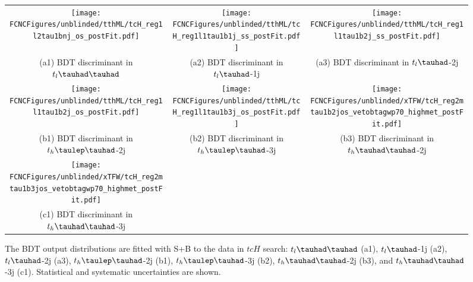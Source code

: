 \begin{figure}[H]
\begin{tabular}{@{}ccc@{}}
\texttt{[image: \\FCNCFigures/unblinded/tthML/tcH\_reg1l2tau1bnj\_os\_postFit.pdf]}&
\texttt{[image: \\FCNCFigures/unblinded/tthML/tcH\_reg1l1tau1b1j\_ss\_postFit.pdf]}&
\texttt{[image: \\FCNCFigures/unblinded/tthML/tcH\_reg1l1tau1b2j\_ss\_postFit.pdf]}\\
(a1) BDT discriminant in $t_l\thadhad$ & (a2) BDT discriminant in  $t_l\tauhad$-1j& (a3) BDT discriminant in $t_l\tauhad$-2j\\
\texttt{[image: \\FCNCFigures/unblinded/tthML/tcH\_reg1l1tau1b2j\_os\_postFit.pdf]}&
\texttt{[image: \\FCNCFigures/unblinded/tthML/tcH\_reg1l1tau1b3j\_os\_postFit.pdf]}&
\texttt{[image: \\FCNCFigures/unblinded/xTFW/tcH\_reg2mtau1b2jos\_vetobtagwp70\_highmet\_postFit.pdf]}\\
(b1) BDT discriminant in $t_h\tlhad$-2j & (b2) BDT discriminant in  $t_h\tlhad$-3j & (b3) BDT discriminant in $t_h\thadhad$-2j \\
\texttt{[image: \\FCNCFigures/unblinded/xTFW/tcH\_reg2mtau1b3jos\_vetobtagwp70\_highmet\_postFit.pdf]}& \\
(c1) BDT discriminant in$t_h\thadhad$-3j\\
\end{tabular}
\caption{ The BDT output distributions are fitted with S+B to the data in $tcH$ search: $t_l\thadhad$ (a1),  $t_l\tauhad$-1j (a2),  $t_l\tauhad$-2j (a3),
  $t_h\tlhad$-2j (b1), $t_h\tlhad$-3j (b2), $t_h\thadhad$-2j (b3), and $t_h\thadhad$-3j (c1). Statistical and systematic uncertainties are shown.}
\label{fig:asimov_postfitbdtHc}
\end{figure}

